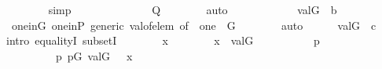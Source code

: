 \begin{isabellebody}
\ \ \ \ \ \ \isamarkupfalse%
\ simp\isanewline
\ \ \ \ \isamarkupfalse%
\ \isanewline
\ \ \ \ \isamarkupfalse%
\ {\isachardoublequoteopen}{\isacharquery}{\kern0pt}{\isasymtheta}\ {\isasymin}\ {\isacharquery}{\kern0pt}Q{\isachardoublequoteclose}\isanewline
\ \ \ \ \ \ \isamarkupfalse%
\ auto\isanewline
\ \ \ \ \isamarkupfalse%
\ \isanewline
\ \ \ \ \isamarkupfalse%
\ {\isachardoublequoteopen}val{\isacharparenleft}{\kern0pt}G{\isacharcomma}{\kern0pt}{\isacharquery}{\kern0pt}{\isasymtheta}{\isacharparenright}{\kern0pt}\ {\isasymin}\ {\isacharquery}{\kern0pt}b{\isachardoublequoteclose}\isanewline
\ \ \ \ \ \ \isamarkupfalse%
\ one{\isacharunderscore}{\kern0pt}in{\isacharunderscore}{\kern0pt}G\ one{\isacharunderscore}{\kern0pt}in{\isacharunderscore}{\kern0pt}P\ generic\ val{\isacharunderscore}{\kern0pt}of{\isacharunderscore}{\kern0pt}elem\ {\isacharbrackleft}{\kern0pt}of\ {\isacharquery}{\kern0pt}{\isasymtheta}\ one\ {\isacharquery}{\kern0pt}{\isasympi}\ G{\isacharbrackright}{\kern0pt}\isanewline
\ \ \ \ \ \ \isamarkupfalse%
\ auto\isanewline
\ \ \ \ \isamarkupfalse%
\ {\isachardoublequoteopen}val{\isacharparenleft}{\kern0pt}G{\isacharcomma}{\kern0pt}{\isacharquery}{\kern0pt}{\isasymtheta}{\isacharparenright}{\kern0pt}\ {\isacharequal}{\kern0pt}\ c{\isachardoublequoteclose}\isanewline
\ \ \ \ \isamarkupfalse%
{\isacharparenleft}{\kern0pt}intro\ equalityI\ subsetI{\isacharparenright}{\kern0pt}\isanewline
\ \ \ \ \ \ \isamarkupfalse%
\ x\isanewline
\ \ \ \ \ \ \isamarkupfalse%
\ {\isachardoublequoteopen}x\ {\isasymin}\ val{\isacharparenleft}{\kern0pt}G{\isacharcomma}{\kern0pt}{\isacharquery}{\kern0pt}{\isasymtheta}{\isacharparenright}{\kern0pt}{\isachardoublequoteclose}\isanewline
\ \ \ \ \ \ \isamarkupfalse%
\ \isamarkupfalse%
\ {\isasymsigma}\ p\ \isanewline
\ \ \ \ \ \ \ \ {}{\isacharcolon}{\kern0pt}\ {\isachardoublequoteopen}{\isacharless}{\kern0pt}{\isasymsigma}{\isacharcomma}{\kern0pt}p{\isachargreater}{\kern0pt}{\isasymin}{\isacharquery}{\kern0pt}{\isasymtheta}{\isachardoublequoteclose}\ {\isachardoublequoteopen}p{\isasymin}G{\isachardoublequoteclose}\ {\isachardoublequoteopen}val{\isacharparenleft}{\kern0pt}G{\isacharcomma}{\kern0pt}{\isasymsigma}{\isacharparenright}{\kern0pt}\ {\isacharequal}{\kern0pt}\ \ x{\isachardoublequoteclose}\isanewline
\ \ \ \ \ \ \ \ \isamarkupfalse%

\end{isabellebody}
